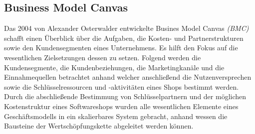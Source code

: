 \subsection{Business Model Canvas} \label{bmc}
Das 2004 von Alexander Osterwalder entwickelte Busines Model Canvas \textit{(BMC)} schafft einen Überblick über die Aufgaben, die Kosten- und Partnerstrukturen sowie den Kundensegmenten eines Unternehmens. Es hilft den Fokus auf die wesentlichen Zielsetzungen dessen zu setzen.\cite[Vgl. ]{b105} Folgend werden die Kundensegmente, die Kundenbeziehungen, die Marketingkanäle und die Einnahmequellen betrachtet anhand welcher anschließend die Nutzenversprechen sowie die Schlüsselressourcen und -aktivitäten eines Shops bestimmt werden. Durch die abschließende Bestimmung von Schlüsselpartnern und der möglichen Kostenstruktur eines Softwareshops wurden \glqq alle wesentlichen Elemente eines Geschäftsmodells in ein skalierbares System gebracht\grqq\cite[S.\, 14]{bmc}, anhand wessen die Bausteine der Wertschöpfungskette abgeleitet werden können.

